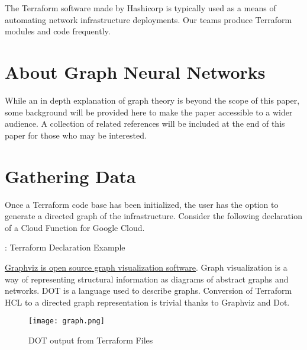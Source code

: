 



\vspace{2mm}

\vspace{2mm}
\section{\label{sec:Introduction}\mytitle}

\justifying
The Terraform software made by Hashicorp is typically used as a means of automating network infrastructure
deployments. Our teams produce Terraform modules and code frequently.

\section{\label{sec:Graph}About Graph Neural Networks}

\justifying
While an in depth explanation of graph theory is beyond the scope of this paper, some background
will be provided here to make the paper accessible to a wider audience. A collection of related references
will be included at the end of this paper for those who may be interested.

\section{\label{sec:collection}Gathering Data}

\justifying
Once a Terraform code base has been initialized, the user has the option to generate a directed graph of the infrastructure. Consider the following declaration of a Cloud Function for Google Cloud.

\begin{mybox}{\thetcbcounter: Terraform Declaration Example}
    
\end{mybox}


\justifying
\href{https://graphviz.org/}{Graphviz is open source graph visualization software}. Graph visualization is a way of representing
structural information as diagrams of abstract graphs and networks. DOT is a language used to describe graphs. Conversion of
Terraform HCL to a directed graph representation is trivial thanks to Graphviz and Dot.

\justifying
\begin{figure}[H]
	\texttt{[image: graph.png]}
	\caption{DOT output from Terraform Files}
	\label{design}
\end{figure}


